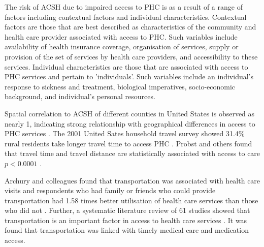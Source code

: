 The risk of ACSH due to impaired access to PHC is as a result of a range of factors including contextual factors and individual characteristics. Contextual factors are those that are best described as characteristics of the community and health care provider associated with access to PHC. Such variables include availability of health insurance coverage, organisation of services, supply or provision of the set of services by health care providers, and accessibility to these services. Individual characteristics are those that are associated with access to PHC services and pertain to 'individuals'. Such variables include an individual's response to sickness and treatment, biological imperatives, socio-economic background, and individual's personal resources.

Spatial correlation to ACSH of different counties in United States is observed as nearly 1, indicating strong relationship with geographical differences in access to PHC services \cite{mobley2006spatial}. The 2001 United Sates household travel survey showed 31.4\% rural residents take longer travel time to access PHC \cite{probst2007effects}. Probst and others found that travel time and travel distance are statistically associated with access to care $p<0.0001$ \cite{probst2007effects}. 

Archury and colleagues found that transportation was associated with health care visits and respondents who had family or friends who could provide transportation had 1.58 times better utilisation of health care services than those who did not \cite{arcury2005effects}. Further, a systematic literature review of 61 studies showed that transportation is an important factor in access to health care services \cite{syed2013traveling}. It was found that transportation was linked with timely medical care and medication access. 

